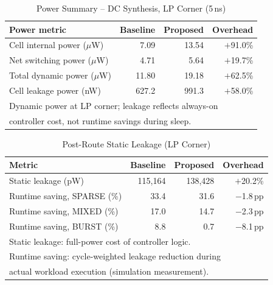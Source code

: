 \begin{table}[t]
\centering
\small
\caption{Power Summary -- DC Synthesis, LP Corner (5\,ns)}
\label{tab:power}
\setlength{\tabcolsep}{5pt}
\begin{tabular}{l rr r}
\toprule
Power metric & Baseline & Proposed & Overhead \\
\midrule
Cell internal power ($\mu$W)   & 7.09  & 13.54 & $+$91.0\% \\
Net switching power ($\mu$W)   & 4.71  & 5.64  & $+$19.7\% \\
Total dynamic power ($\mu$W)   & 11.80 & 19.18 & $+$62.5\% \\
Cell leakage power (nW)        & 627.2 & 991.3 & $+$58.0\% \\
\bottomrule
\multicolumn{4}{l}{\footnotesize Dynamic power at LP corner; leakage reflects always-on} \\
\multicolumn{4}{l}{\footnotesize controller cost, not runtime savings during sleep.} \\
\end{tabular}
\end{table}

\begin{table}[t]
\centering
\small
\caption{Post-Route Static Leakage (LP Corner)}
\label{tab:leakage}
\setlength{\tabcolsep}{5pt}
\begin{tabular}{l rr r}
\toprule
Metric & Baseline & Proposed & Overhead \\
\midrule
Static leakage (pW)  & 115,164 & 138,428 & $+$20.2\% \\
Runtime saving, SPARSE (\%)  & 33.4 & 31.6 & $-$1.8\,pp \\
Runtime saving, MIXED (\%)   & 17.0 & 14.7 & $-$2.3\,pp \\
Runtime saving, BURST (\%)   & 8.8  & 0.7  & $-$8.1\,pp \\
\bottomrule
\multicolumn{4}{l}{\footnotesize Static leakage: full-power cost of controller logic.} \\
\multicolumn{4}{l}{\footnotesize Runtime saving: cycle-weighted leakage reduction during} \\
\multicolumn{4}{l}{\footnotesize actual workload execution (simulation measurement).} \\
\end{tabular}
\end{table}

